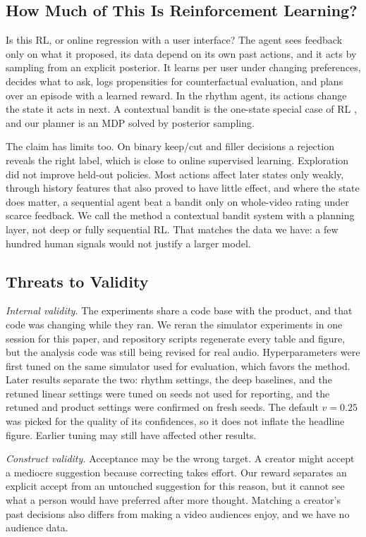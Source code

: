 \documentclass{ieeeaccess}
\begin{document}
\subsection{How Much of This Is Reinforcement Learning?}
Is this RL, or online regression with a user interface? The agent sees feedback only on what it proposed, its data depend on its own past actions, and it acts by sampling from an explicit posterior. It learns per user under changing preferences, decides what to ask, logs propensities for counterfactual evaluation, and plans over an episode with a learned reward. In the rhythm agent, its actions change the state it acts in next. A contextual bandit is the one-state special case of RL \cite{sutton2018,lattimore2020}, and our planner is an MDP solved by posterior sampling.

The claim has limits too. On binary keep/cut and filler decisions a rejection reveals the right label, which is close to online supervised learning. Exploration did not improve held-out policies. Most actions affect later states only weakly, through history features that also proved to have little effect, and where the state does matter, a sequential agent beat a bandit only on whole-video rating under scarce feedback. We call the method a contextual bandit system with a planning layer, not deep or fully sequential RL. That matches the data we have: a few hundred human signals would not justify a larger model.

\subsection{Threats to Validity}
\textit{Internal validity.} The experiments share a code base with the product, and that code was changing while they ran. We reran the simulator experiments in one session for this paper, and repository scripts regenerate every table and figure, but the analysis code was still being revised for real audio. Hyperparameters were first tuned on the same simulator used for evaluation, which favors the method. Later results separate the two: rhythm settings, the deep baselines, and the retuned linear settings were tuned on seeds not used for reporting, and the retuned and product settings were confirmed on fresh seeds. The default $v=0.25$ was picked for the quality of its confidences, so it does not inflate the headline figure. Earlier tuning may still have affected other results.

\textit{Construct validity.} Acceptance may be the wrong target. A creator might accept a mediocre suggestion because correcting takes effort. Our reward separates an explicit accept from an untouched suggestion for this reason, but it cannot see what a person would have preferred after more thought. Matching a creator's past decisions also differs from making a video audiences enjoy, and we have no audience data.
\end{document}
